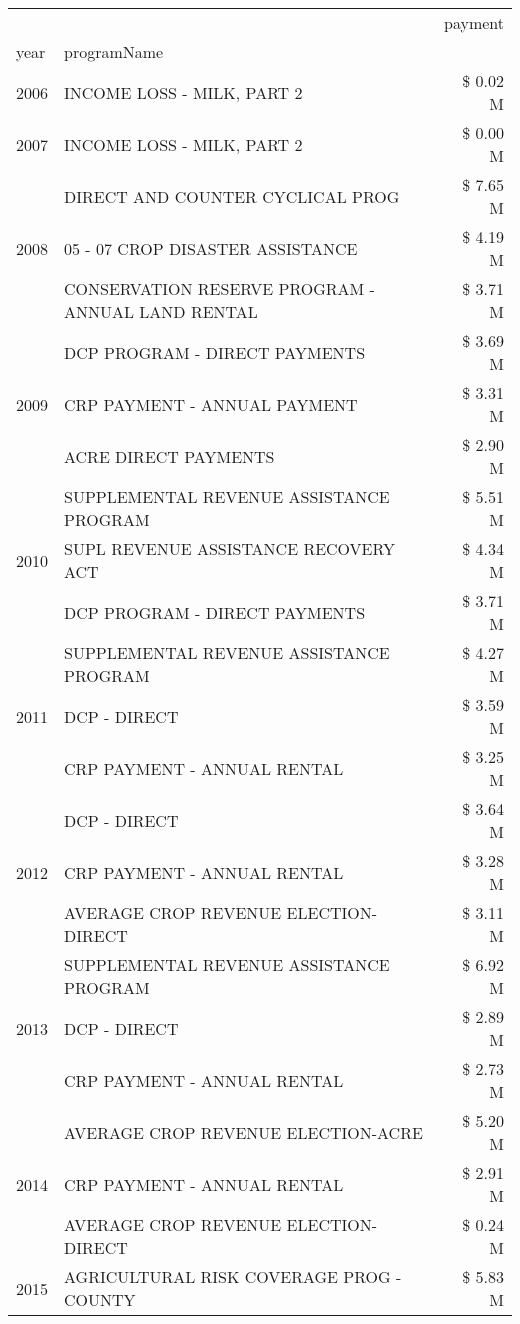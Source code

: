 \begin{tabular}{llr}
\toprule
 &  & payment \\
year & programName &  \\
\midrule
2006 & INCOME LOSS - MILK, PART 2 & \$ 0.02 M \\
\cline{1-3}
2007 & INCOME LOSS - MILK, PART 2 & \$ 0.00 M \\
\cline{1-3}
\multirow[t]{3}{*}{2008} & DIRECT AND COUNTER CYCLICAL PROG & \$ 7.65 M \\
 & 05 - 07 CROP DISASTER ASSISTANCE & \$ 4.19 M \\
 & CONSERVATION RESERVE PROGRAM - ANNUAL LAND RENTAL & \$ 3.71 M \\
\cline{1-3}
\multirow[t]{3}{*}{2009} & DCP PROGRAM - DIRECT PAYMENTS & \$ 3.69 M \\
 & CRP PAYMENT - ANNUAL PAYMENT & \$ 3.31 M \\
 & ACRE DIRECT PAYMENTS & \$ 2.90 M \\
\cline{1-3}
\multirow[t]{3}{*}{2010} & SUPPLEMENTAL REVENUE ASSISTANCE PROGRAM & \$ 5.51 M \\
 & SUPL REVENUE ASSISTANCE RECOVERY ACT & \$ 4.34 M \\
 & DCP PROGRAM - DIRECT PAYMENTS & \$ 3.71 M \\
\cline{1-3}
\multirow[t]{3}{*}{2011} & SUPPLEMENTAL REVENUE ASSISTANCE PROGRAM & \$ 4.27 M \\
 & DCP - DIRECT & \$ 3.59 M \\
 & CRP PAYMENT - ANNUAL RENTAL & \$ 3.25 M \\
\cline{1-3}
\multirow[t]{3}{*}{2012} & DCP - DIRECT & \$ 3.64 M \\
 & CRP PAYMENT - ANNUAL RENTAL & \$ 3.28 M \\
 & AVERAGE CROP REVENUE ELECTION-DIRECT & \$ 3.11 M \\
\cline{1-3}
\multirow[t]{3}{*}{2013} & SUPPLEMENTAL REVENUE ASSISTANCE PROGRAM & \$ 6.92 M \\
 & DCP - DIRECT & \$ 2.89 M \\
 & CRP PAYMENT - ANNUAL RENTAL & \$ 2.73 M \\
\cline{1-3}
\multirow[t]{3}{*}{2014} & AVERAGE CROP REVENUE ELECTION-ACRE & \$ 5.20 M \\
 & CRP PAYMENT - ANNUAL RENTAL & \$ 2.91 M \\
 & AVERAGE CROP REVENUE ELECTION-DIRECT & \$ 0.24 M \\
\cline{1-3}
\multirow[t]{3}{*}{2015} & AGRICULTURAL RISK COVERAGE PROG - COUNTY & \$ 5.83 M \\

\end{tabular}
